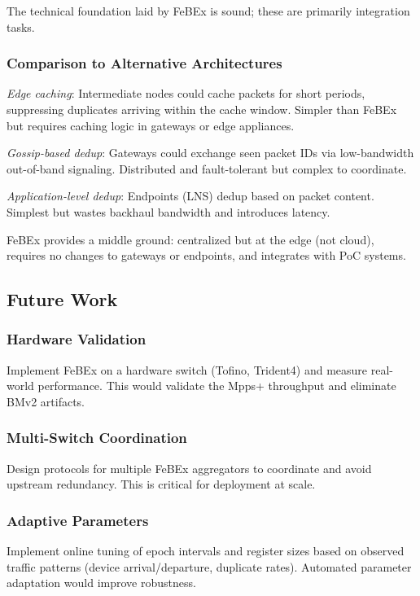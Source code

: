 The technical foundation laid by FeBEx is sound; these are primarily integration tasks.

\subsubsection{Comparison to Alternative Architectures}

\textit{Edge caching}: Intermediate nodes could cache packets for short periods, suppressing duplicates arriving within the cache window. Simpler than FeBEx but requires caching logic in gateways or edge appliances.

\textit{Gossip-based dedup}: Gateways could exchange seen packet IDs via low-bandwidth out-of-band signaling. Distributed and fault-tolerant but complex to coordinate.

\textit{Application-level dedup}: Endpoints (LNS) dedup based on packet content. Simplest but wastes backhaul bandwidth and introduces latency.

FeBEx provides a middle ground: centralized but at the edge (not cloud), requires no changes to gateways or endpoints, and integrates with PoC systems.

\subsection{Future Work}

\subsubsection{Hardware Validation}

Implement FeBEx on a hardware switch (Tofino, Trident4) and measure real-world performance. This would validate the Mpps+ throughput and eliminate BMv2 artifacts.

\subsubsection{Multi-Switch Coordination}

Design protocols for multiple FeBEx aggregators to coordinate and avoid upstream redundancy. This is critical for deployment at scale.

\subsubsection{Adaptive Parameters}

Implement online tuning of epoch intervals and register sizes based on observed traffic patterns (device arrival/departure, duplicate rates). Automated parameter adaptation would improve robustness.


